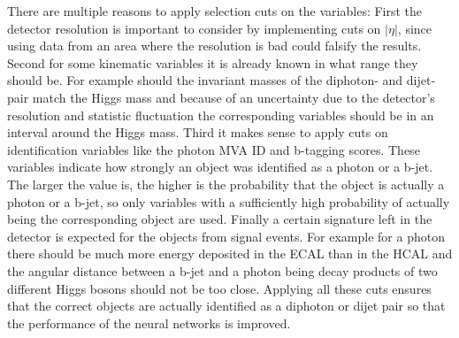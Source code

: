 


There are multiple reasons to apply selection cuts on the variables:
First the detector resolution is important to consider by implementing cuts on $| \eta |$, since using data from an area where the resolution is bad could falsify the results.
Second for some kinematic variables it is already known in what range they should be. For example should the invariant masses of the diphoton- and dijet-pair match the Higgs mass and because of
an uncertainty due to the detector's resolution and statistic fluctuation the corresponding variables should be in an interval around the Higgs mass.
Third it makes sense to apply cuts on identification variables like the photon MVA ID and b-tagging scores. These variables indicate how strongly an object was identified as a photon or a b-jet.
The larger the value is, the higher is the probability that the object is actually a photon or a b-jet, so only variables with a sufficiently high probability of actually being the corresponding object are used. 
Finally a certain signature left in the detector is expected for the objects from signal events. For example for a photon there should be much more energy deposited in the ECAL than in the HCAL and 
the angular distance between a b-jet and a photon being decay products of two different Higgs bosons should not be too close.
Applying all these cuts ensures that the correct objects are actually identified as a diphoton or dijet pair so that the performance of the neural networks is improved.


